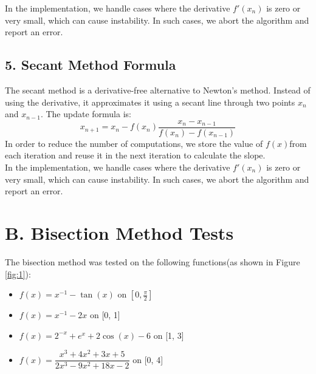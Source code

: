\documentclass[a4paper]{article}
\begin{document}
In the implementation, we handle cases where the derivative \( f'(x_n) \) is zero or very small, which can cause instability. In such cases, we abort the algorithm and report an error.

\subsection*{5. Secant Method Formula}
The secant method is a derivative-free alternative to Newton's method. Instead of using the derivative, it approximates it using a secant line through two points \( x_n \) and \( x_{n-1} \). The update formula is:
\[
x_{n+1} = x_n - f(x_n) \frac{x_n - x_{n-1}}{f(x_n) - f(x_{n-1})}
\]
In order to reduce the number of computations, we store the value of \( f(x) \)from each iteration and reuse it in the next iteration to calculate the slope. \\
In the implementation, we handle cases where the derivative \( f'(x_n) \) is zero or very small, which can cause instability. In such cases, we abort the algorithm and report an error.

\section*{B. Bisection Method Tests}

The bisection method was tested on the following functions(as shown in Figure \ref{fig:1}):
\begin{itemize}
    \item \(f(x) = x^{-1} - \tan(x)\) on \([0, \frac{\pi}{2}]\)
    \item \(f(x) = x^{-1} - 2x\) on [0, 1]
    \item \(f(x) = 2^{-x} + e^x + 2\cos(x) - 6\) on [1, 3]
    \item \(f(x) = \dfrac{x^3 + 4x^2 + 3x + 5}{2x^3 - 9x^2 + 18x - 2}\) on [0, 4]
\end{itemize}
\end{document}
